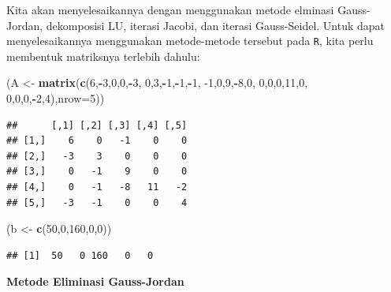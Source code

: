 \documentclass[]{book}
\newenvironment{Shaded}{\begin{snugshade}}{\end{snugshade}}
\newcommand{\DataTypeTok}[1]{\textcolor[rgb]{0.13,0.29,0.53}{#1}}
\newcommand{\DecValTok}[1]{\textcolor[rgb]{0.00,0.00,0.81}{#1}}
\newcommand{\KeywordTok}[1]{\textcolor[rgb]{0.13,0.29,0.53}{\textbf{#1}}}
\newcommand{\NormalTok}[1]{#1}
\newcommand{\OperatorTok}[1]{\textcolor[rgb]{0.81,0.36,0.00}{\textbf{#1}}}
\newcommand{\StringTok}[1]{\textcolor[rgb]{0.31,0.60,0.02}{#1}}
\theoremstyle{definition}
\theoremstyle{definition}
\theoremstyle{definition}
\theoremstyle{remark}
\begin{document}
Kita akan menyelesaikannya dengan menggunakan metode elminasi Gauss-Jordan, dekomposisi LU, iterasi Jacobi, dan iterasi Gauss-Seidel. Untuk dapat menyelesaikannya menggunakan metode-metode tersebut pada \texttt{R}, kita perlu membentuk matriksnya terlebih dahulu:

\begin{Shaded}
\begin{Highlighting}[]
\NormalTok{(A <-}\StringTok{ }\KeywordTok{matrix}\NormalTok{(}\KeywordTok{c}\NormalTok{(}\DecValTok{6}\NormalTok{,}\OperatorTok{-}\DecValTok{3}\NormalTok{,}\DecValTok{0}\NormalTok{,}\DecValTok{0}\NormalTok{,}\OperatorTok{-}\DecValTok{3}\NormalTok{,}
              \DecValTok{0}\NormalTok{,}\DecValTok{3}\NormalTok{,}\OperatorTok{-}\DecValTok{1}\NormalTok{,}\OperatorTok{-}\DecValTok{1}\NormalTok{,}\OperatorTok{-}\DecValTok{1}\NormalTok{,}
              \DecValTok{-1}\NormalTok{,}\DecValTok{0}\NormalTok{,}\DecValTok{9}\NormalTok{,}\OperatorTok{-}\DecValTok{8}\NormalTok{,}\DecValTok{0}\NormalTok{,}
              \DecValTok{0}\NormalTok{,}\DecValTok{0}\NormalTok{,}\DecValTok{0}\NormalTok{,}\DecValTok{11}\NormalTok{,}\DecValTok{0}\NormalTok{,}
              \DecValTok{0}\NormalTok{,}\DecValTok{0}\NormalTok{,}\DecValTok{0}\NormalTok{,}\OperatorTok{-}\DecValTok{2}\NormalTok{,}\DecValTok{4}\NormalTok{),}\DataTypeTok{nrow=}\DecValTok{5}\NormalTok{))}
\end{Highlighting}
\end{Shaded}

\begin{verbatim}
##      [,1] [,2] [,3] [,4] [,5]
## [1,]    6    0   -1    0    0
## [2,]   -3    3    0    0    0
## [3,]    0   -1    9    0    0
## [4,]    0   -1   -8   11   -2
## [5,]   -3   -1    0    0    4
\end{verbatim}

\begin{Shaded}
\begin{Highlighting}[]
\NormalTok{(b <-}\StringTok{ }\KeywordTok{c}\NormalTok{(}\DecValTok{50}\NormalTok{,}\DecValTok{0}\NormalTok{,}\DecValTok{160}\NormalTok{,}\DecValTok{0}\NormalTok{,}\DecValTok{0}\NormalTok{))}
\end{Highlighting}
\end{Shaded}

\begin{verbatim}
## [1]  50   0 160   0   0
\end{verbatim}

\textbf{Metode Eliminasi Gauss-Jordan}
\end{document}
